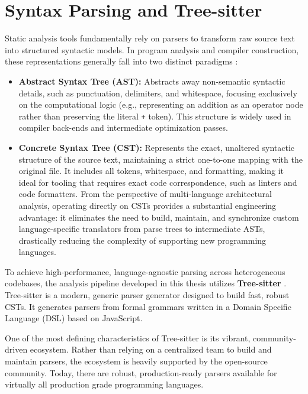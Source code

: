 \section{Syntax Parsing and Tree-sitter}
\label{sec:parsing_and_treesitter}

Static analysis tools fundamentally rely on parsers to transform raw
source text into structured syntactic models. In program analysis and
compiler construction, these representations generally fall into two
distinct paradigms \cite{aho_compilers_2007, scott_programming_2016}:
\begin{itemize}
  \item \textbf{Abstract Syntax Tree (AST):} Abstracts away
    non-semantic syntactic details, such as punctuation, delimiters,
    and whitespace, focusing exclusively on the computational logic
    (e.g., representing an addition as an operator node rather than
    preserving the literal \texttt{+} token). This structure is
    widely used in compiler back-ends and intermediate optimization passes.
  \item \textbf{Concrete Syntax Tree (CST):} Represents the exact,
    unaltered syntactic structure of the source text, maintaining a
    strict one-to-one mapping with the original file. It includes all
    tokens, whitespace, and formatting, making it ideal for tooling
    that requires exact code correspondence, such as linters and code
    formatters. From the perspective of multi-language architectural
    analysis, operating directly on CSTs provides a substantial
    engineering advantage: it eliminates the need to build, maintain,
    and synchronize custom language-specific translators from parse
    trees to intermediate ASTs, drastically reducing the complexity
    of supporting new programming languages.
\end{itemize}

To achieve high-performance, language-agnostic parsing across
heterogeneous codebases, the analysis pipeline developed in this
thesis utilizes \textbf{Tree-sitter} \cite{brunsfeld_treesitter_2018}.
Tree-sitter is a modern, generic parser generator designed to build
fast, robust CSTs. It generates parsers from formal grammars written
in a Domain Specific Language (DSL) based on JavaScript.

One of the most defining characteristics of Tree-sitter is its vibrant,
comm\-unity-driven ecosystem. Rather than relying on a centralized team
to build and maintain parsers, the ecosystem is heavily supported by
the open-source community. Today, there are robust, production-ready
parsers available for virtually all production grade programming languages.

